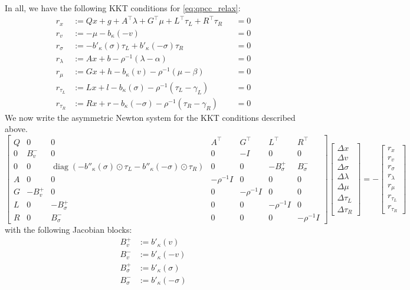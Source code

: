\documentclass[11pt]{article}
\theoremstyle{plain}
\theoremstyle{definition}
\theoremstyle{remark}
\newcommand{\diag}{\operatorname{diag}}
\begin{document}
In all, we have the following KKT conditions for \eqref{eq:qpcc_relax}:
\begin{align}
    r_x &:= Qx + g + A^\top \lambda + G^\top \mu + L^\top \tau_L + R^\top \tau_R &&= 0 \\
    r_v &:= -\mu - b_\kappa(-v) &&= 0 \\
    r_\sigma &:= -b'_\kappa(\sigma) \tau_L + b'_\kappa(-\sigma) \tau_R &&= 0 \\
    r_\lambda &:= Ax + b - \rho^{-1} (\lambda - \alpha) &&= 0 \\
    r_\mu &:= Gx + h - b_\kappa(v) - \rho^{-1} (\mu - \beta) &&= 0 \\
    r_{\tau_L} &:= Lx + l - b_\kappa(\sigma) - \rho^{-1} (\tau_L - \gamma_L) &&= 0 \\
    r_{\tau_R} &:= Rx + r - b_\kappa(-\sigma) - \rho^{-1} (\tau_R - \gamma_R) &&= 0
\end{align}
We now write the asymmetric Newton system for the KKT conditions described above.
\begin{equation}
\begin{bmatrix}
    Q & 0 & 0 & A^\top & G^\top & L^\top & R^\top \\
    0 & B_v^- & 0 & 0 & -I & 0 & 0 \\
    0 & 0 & \diag{(-b''_\kappa(\sigma) \odot \tau_L - b''_\kappa(-\sigma) \odot \tau_R)} & 0 & 0 & -B_\sigma^+ & B_\sigma^- \\
    A & 0 & 0 & -\rho^{-1} I & 0 & 0 & 0 \\
    G & -B_v^+ & 0 & 0 & -\rho^{-1} I & 0 & 0 \\
    L & 0 & -B_\sigma^+ & 0 & 0 & -\rho^{-1} I & 0 \\
    R & 0 & B_\sigma^- & 0 & 0 & 0 & -\rho^{-1} I
\end{bmatrix}
\begin{bmatrix}
    \Delta x \\ \Delta v \\ \Delta \sigma \\ \Delta \lambda \\ \Delta \mu \\ \Delta \tau_L \\ \Delta \tau_R
\end{bmatrix}
=
-\begin{bmatrix}
    r_x \\ r_v \\ r_\sigma \\ r_\lambda \\ r_\mu \\ r_{\tau_L} \\ r_{\tau_R}
\end{bmatrix}
\end{equation}
with the following Jacobian blocks:
\begin{subequations}
\begin{align}
    B_v^+ &:= b'_\kappa(v) \\
    B_v^- &:= b'_\kappa(-v) \\
    B_\sigma^+ &:= b'_\kappa(\sigma) \\
    B_\sigma^- &:= b'_\kappa(-\sigma)
\end{align}
\end{subequations}
\end{document}
